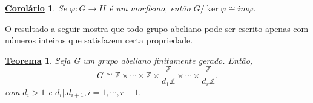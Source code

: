\documentclass{article}
\newtheorem*{theorem*}{\underline{Teorema}}
\newtheorem*{crl*}{\underline{Corol\'ario}}
\begin{document}
\begin{crl*}
  Se $\varphi:G\rightarrow H$ \'e um morfismo, ent\~ao $G/\ker{\varphi}\cong im\varphi.$
\end{crl*}

  O resultado a seguir mostra que todo grupo abeliano pode ser escrito apenas com n\'umeros inteiros que satisfazem certa propriedade.
 \begin{theorem*}
   Seja G um grupo abeliano finitamente gerado. Ent\~ao, 
     $$
       G\cong{} \mathbb{Z}\times \cdots\times \mathbb{Z}\times \frac{\mathbb{Z}}{d_{1}\mathbb{Z}}\times \cdots\times \frac{\mathbb{Z}}{d_{r} \mathbb{Z}}.
     $$
     com $d_{i} > 1$ e $d_{i}\bigl|\bigr. d_{i+1}, i=1,\cdots,r-1.$ 
 \end{theorem*}
\end{document}
